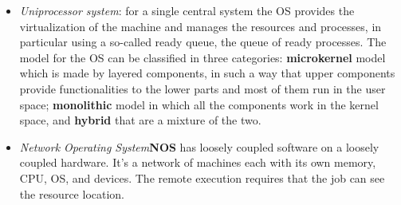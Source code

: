 \documentclass[11pt,a4paper]{article}
\begin{document}
\begin{itemize}
    \item \textit{Uniprocessor system}: for a single central system the OS provides the virtualization of the machine and manages the resources and processes, in particular using a so-called ready queue, the queue of ready processes. The model for the OS can be classified in three categories: \textbf{microkernel} model which is made by layered components, in such a way that upper components provide functionalities to the lower parts and most of them run in the user space; \textbf{monolithic} model in which all the components work in the kernel space, and \textbf{hybrid} that are a mixture of the two. 
    
    \item \textit{Network Operating System}\textbf{NOS} has loosely coupled software on a loosely coupled hardware. It’s a network of machines each with its own memory, CPU, OS, and devices. The remote execution requires that the job can see the resource location.
    

\end{itemize}
\end{document}
